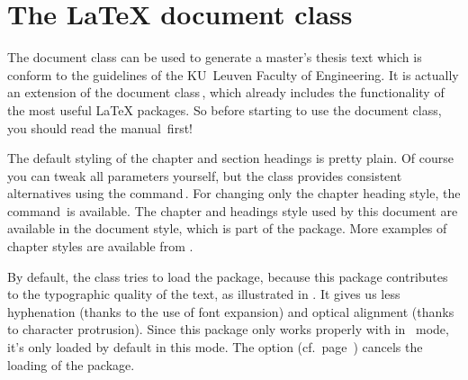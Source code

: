 \newcommand*\optionlabel[1]{\hspace\labelsep
  \let\oldmeta\meta \renewcommand*\meta[1]{{\rmfamily \oldmeta{##1}}}%
  \renewcommand*\and{\unskip\textrm{'' or ``}}%
  \normalfont \textsc{Option%
    \csname kulemt@ifand\endcsname{#1}s} ``\opt{#1}''}
\newcommand*\optionlabelnote[1]{\hfill \textit{(#1)}}
\newcommand*\betweenarrows[1]{%
  $\leftarrow\mkern-7mu\cleaders\hbox{$\mkern-2mu\relbar\mkern-2mu$}\hfill
   \enspace\hbox{#1}\enspace
   \cleaders\hbox{$\mkern-2mu\relbar\mkern-2mu$}\hfill\mkern-7mu\rightarrow$}

\chapter{The LaTeX document class }
\label{cha:kulemt}
The document class  can be used to generate a master's thesis
text which is conform to the guidelines of the KU~Leuven Faculty of
Engineering. It is actually an extension of the  document
class\,\cite{pkg:memoir}, which already includes the functionality of the
most useful LaTeX packages. So before starting to use the 
document class, you should read the  manual\,\cite{memman} first!

The default styling of the chapter and section headings is pretty plain. Of
course you can tweak all parameters yourself, but the  class
provides consistent alternatives using the 
command\,\cite[\S6.9]{memman}. For changing only the chapter heading style,
the  command\,\cite[\S6.5]{memman} is available. The
chapter and headings style used by this document are available in the
 document style, which is part of the  package.
More examples of chapter styles are available from \cite{memchap}.

By default, the  class tries to load the 
package, because this package contributes to the typographic quality of the
text, as illustrated in . It gives us less hyphenation
(thanks to the use of font expansion) and optical alignment (thanks to
character protrusion). Since this package only works properly with
 in \PDF\ mode, it's only loaded by default in this mode.
The option  (cf.\ page~\pageref{opt:nomicrotype}) cancels
the loading of the package.

